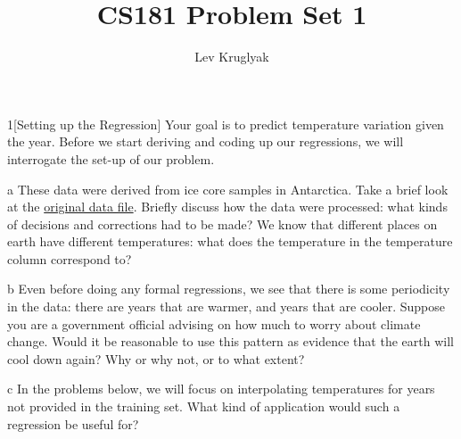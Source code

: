 \documentclass[expanded]{lkx_pset}
\title{CS181 Problem Set 1}
\author{Lev Kruglyak}
\begin{document}
\maketitle

\begin{problem}{1}[Setting up the Regression]
  Your goal is to predict temperature variation given the year.  Before we start deriving and coding up our regressions, we will interrogate the set-up of our problem.  
\end{problem}

\begin{parts}
  \begin{part}{a}
    These data were derived from ice core samples in Antarctica.
    Take a brief look at the
    \href{https://www.ncei.noaa.gov/pub/data/paleo/icecore/antarctica/epica_domec/edc3deuttemp2007.txt}{original
      data file}. Briefly discuss how the data were processed: what kinds of
    decisions and corrections had to be made?  We know that different
    places on earth have different temperatures: what does the
    temperature in the temperature column correspond to?
  \end{part}
        
  \begin{part}{b}
    Even before doing any formal regressions, we see that there is
    some periodicity in the data: there are years that are warmer, and
    years that are cooler.  Suppose you are a government official
    advising on how much to worry about climate change.  Would it be
    reasonable to use this pattern as evidence that the earth will
    cool down again?  Why or why not, or to what extent?
  \end{part}


  \begin{part}{c}
    In the problems below, we will focus on interpolating
    temperatures for years not provided in the training set.  What
    kind of application would such a regression be useful for?
  \end{part}
\end{parts}
\end{document}
